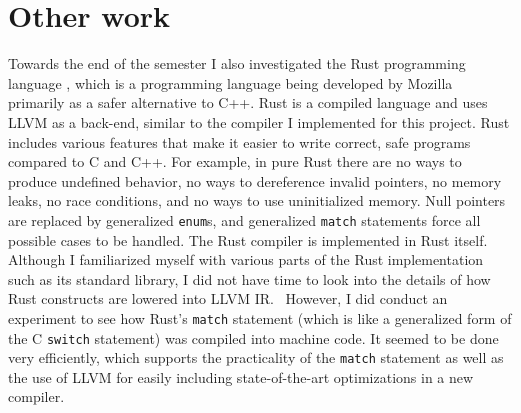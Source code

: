 \documentclass[11pt]{article}
\begin{document}
\section{Other work}

Towards the end of the semester I also investigated the Rust programming
language \cite{rust}, which is a programming language being developed by Mozilla
primarily as a safer alternative to C++.  Rust is a compiled language and uses
LLVM as a back-end, similar to the compiler I implemented for this project.
Rust includes various features that make it easier to write correct, safe
programs compared to C and C++.  For example, in pure Rust there are no ways to
produce undefined behavior, no ways to dereference invalid pointers, no memory
leaks, no race conditions, and no ways to use uninitialized memory.  Null
pointers are replaced by generalized {\tt enum}s, and generalized {\tt match}
statements force all possible cases to be handled.  The Rust compiler is
implemented in Rust itself.  Although I familiarized myself with various parts
of the Rust implementation such as its standard library, I did not have time to
look into the details of how Rust constructs are lowered into LLVM IR. \
However, I did conduct an experiment to see how Rust's {\tt match} statement
(which is like a generalized form of the C {\tt switch} statement) was compiled
into machine code.  It seemed to be done very efficiently, which supports the
practicality of the {\tt match} statement as well as the use of LLVM for easily
including state-of-the-art optimizations in a new compiler.



\end{document}
